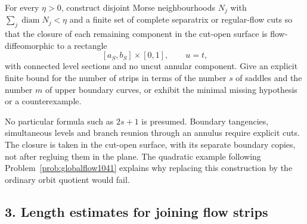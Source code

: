 \documentclass[11pt]{article}
\begin{document}
\begin{problem}\label{prob:reeb1041}
For every $\eta>0$, construct disjoint Morse neighbourhoods $N_j$ with
$\sum_j\operatorname{diam}N_j<\eta$ and a finite set of complete separatrix or
regular-flow cuts so that the closure of each remaining component in
the cut-open surface is flow-diffeomorphic to a rectangle
\[
 [a_S,b_S]\times[0,1],\qquad u=t,
\]
with connected level sections and no uncut annular component.  Give an explicit
finite bound for the number of strips in terms of the number $s$ of
saddles and the number $m$ of upper boundary curves, or exhibit the minimal missing
hypothesis or a counterexample.
\end{problem}

No particular formula such as $2s+1$ is presumed. Boundary tangencies,
simultaneous levels and branch reunion through an annulus require explicit
cuts. The closure is taken in the cut-open surface, with its separate
boundary copies, not after regluing them in the plane. The quadratic
example following Problem~\ref{prob:globalflow1041} explains why replacing
this construction by the ordinary orbit quotient would fail.

\subsection*{3. Length estimates for joining flow strips}
\end{document}
